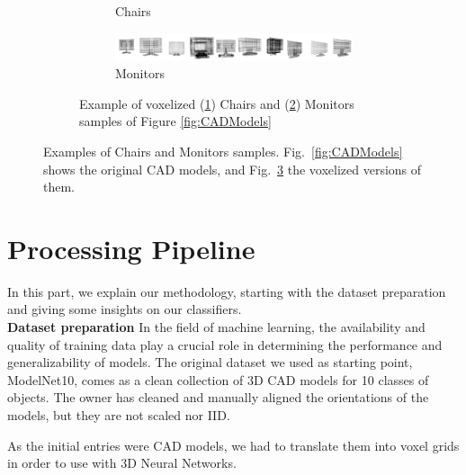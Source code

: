 \begin{figure}[h]
\begin{center}
\begin{subfigure}{0.45\textwidth}
\begin{subfigure}[b]{\textwidth}
                 \caption{Chairs}
                 \label{fig:chairsVoxels}
             \end{subfigure}
             \begin{subfigure}[b]{\textwidth}
                \addtocounter{subfigure}{-1}
                \renewcommand\thesubfigure{\alph{subfigure}.II}
                 \centering
                 \includegraphics[width=\textwidth]{resources/monitors_voxels.png}
                 \caption{Monitors}
                 \label{fig:monitorsVoxels}
             \end{subfigure}
            \addtocounter{subfigure}{-1}
             
            \caption{Example of voxelized (\ref{fig:chairsVoxels}) Chairs and (\ref{fig:monitorsVoxels}) Monitors samples of Figure \ref{fig:CADModels}}
            \label{fig:VoxelizedModels}
        \end{subfigure}
        \caption{Examples of Chairs and Monitors samples. Fig.~\ref{fig:CADModels} shows the original CAD models, and Fig.~\ref{fig:VoxelizedModels} the voxelized versions of them.} 
        \label{fig:samples}
    \end{center}
\end{figure}
\section{Processing Pipeline}
\label{sec:pipeline}

In this part, we explain our methodology, starting with the dataset preparation and giving some insights on our classifiers.\\

\textbf{Dataset preparation}
In the field of machine learning, the availability and quality of training data play a crucial role in determining the performance and generalizability of models. The original dataset we used as starting point, ModelNet10, comes as a clean collection of 3D CAD models for 10 classes of objects.
The owner has cleaned and manually aligned the orientations of the models, but they are not scaled nor \ac{IID}.

As the initial entries were CAD models, we had to translate them into voxel grids in order to use with 3D Neural Networks. 

